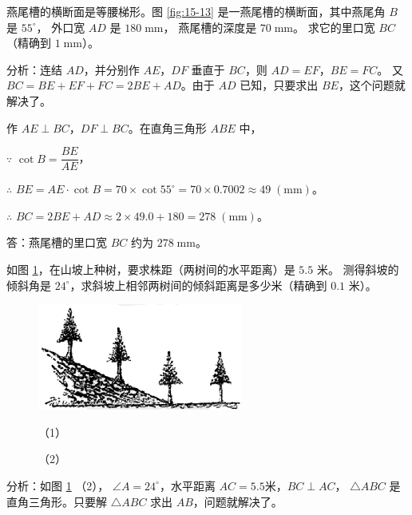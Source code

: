 \begin{enhancedline}
\begingroup
\renewcommand{\haomi}{\mathord{\text{mm}}}%

\liti 燕尾槽的横断面是等腰梯形。图 \ref{fig:15-13} 是一燕尾槽的横断面，其中燕尾角 $B$ 是 $55^\circ$，
外口宽 $AD$ 是 $180\;\haomi$， 燕尾槽的深度是 $70\;\haomi$。
求它的里口宽 $BC$（精确到 $1\;\haomi$）。

分析：连结 $AD$，并分别作 $AE$，$DF$ 垂直于 $BC$，则 $AD = EF$，$BE = FC$。
又 $BC = BE + EF + FC = 2BE + AD$。由于 $AD$ 已知，只要求出 $BE$，这个问题就解决了。

\jie 作 $AE \perp BC$，$DF \perp BC$。在直角三角形 $ABE$ 中，

$\because$   \quad $\cot B = \dfrac{BE}{AE}$，

$\therefore$ \quad $BE = AE \cdot \cot B = 70 \times \cot 55^\circ = 70 \times 0.7002 \approx 49 \; (\haomi)$。

$\therefore$ \quad $BC = 2BE + AD \approx 2 \times 49.0 + 180 = 278 \; (\haomi)$。

答：燕尾槽的里口宽 $BC$ 约为 $278 \; \haomi$。
\endgroup


\liti 如图 \ref{fig:15-14}，在山坡上种树，要求株距（两树间的水平距离）是 $5.5$ 米。
测得斜坡的倾斜角是 $24^\circ$，求斜坡上相邻两树间的倾斜距离是多少米（精确到 $0.1$ 米）。

\begin{figure}[htbp]
    \centering
    \begin{minipage}[b]{8cm}
        \centering
        \includegraphics[width=0.6\textwidth]{../pic/czds4-ch15-14-1}
        \caption*{（1）}
    \end{minipage}
    \qquad
    \begin{minipage}[b]{6cm}
        \centering
        
        \caption*{（2）}
    \end{minipage}
    \caption{}\label{fig:15-14}
\end{figure}


分析：如图 \ref{fig:15-14} （2）， $\angle A = 24^\circ$，水平距离 $AC = 5.5$米，$BC \perp AC$，
$\triangle ABC$ 是直角三角形。只要解 $\triangle ABC$ 求出 $AB$，问题就解决了。


\end{enhancedline}
